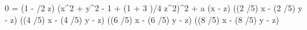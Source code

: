 0 = \left(1 - /2 z\right) \cdot \left(x^{2} + y^{2} - 1 + \left(1 + 3 \right)/4 z^{2}\right)^{2} + a \left(x - z\right) \cdot \left(\cos\left(2 \pi/5\right) x - \sin\left(2 \pi/5\right) y - z\right) \cdot \left(\cos\left(4 \pi/5\right) x - \sin\left(4 \pi/5\right) y - z\right) \cdot \left(\cos\left(6 \pi/5\right) x - \sin\left(6 \pi/5\right) y - z\right) \cdot \left(\cos\left(8 \pi/5\right) x - \sin\left(8 \pi/5\right) y - z\right)
